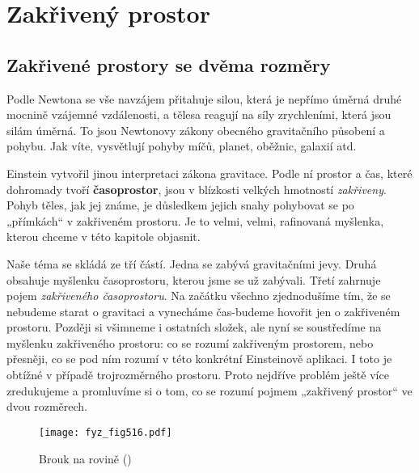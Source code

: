 {
\chapter{Zakřivený prostor}\label{fyz:IIchapXLII}
\minitoc
   
  \section{Zakřivené prostory se dvěma rozměry}\label{fyz:IIchapXLIIsecI}
    Podle Newtona se vše navzájem přitahuje silou, která je nepřímo úměrná druhé mocnině vzájemné 
    vzdálenosti, a tělesa reagují na síly zrychleními, která jsou silám úměrná. To jsou Newtonovy 
    zákony obecného gravitačního působení a pohybu. Jak víte, vysvětlují pohyby míčů, planet, 
    oběžnic, galaxií atd.
    
    Einstein vytvořil jinou interpretaci zákona gravitace. Podle ní prostor a čas, které dohromady 
    tvoří \textbf{časoprostor}, jsou v blízkosti velkých hmotností \emph{zakřiveny}. Pohyb těles, 
    jak jej známe, je důsledkem jejich snahy pohybovat se po „přímkách“ v zakřiveném prostoru. Je 
    to velmi, velmi, rafinovaná myšlenka, kterou chceme v této kapitole objasnit.
    
    Naše téma se skládá ze tří částí. Jedna se zabývá gravitačními jevy. Druhá obsahuje myšlenku 
    časoprostoru, kterou jsme se už zabývali. Třetí zahrnuje pojem \emph{zakřiveného časoprostoru}. 
    Na začátku všechno zjednodušíme tím, že se nebudeme starat o gravitaci a vynecháme čas-budeme 
    hovořit jen o zakřiveném prostoru. Později si všimneme i ostatních složek, ale nyní se 
    soustředíme na myšlenku zakřiveného prostoru: co se rozumí zakřiveným prostorem, nebo přesněji, 
    co se pod ním rozumí v této konkrétní Einsteinově aplikaci. I toto je obtížné v případě 
    trojrozměrného prostoru. Proto nejdříve problém ještě více zredukujeme a promluvíme si o tom, 
    co se rozumí pojmem „zakřivený prostor“ ve dvou rozměrech.

    \begin{figure}[ht!] %
      \centering
      \texttt{[image: fyz\_fig516.pdf]}
      \caption{Brouk na rovině 
               (\cite[s.~775]{Feynman02})}
      \label{fyz_fig516}
    \end{figure}
    
}
